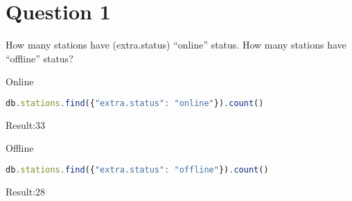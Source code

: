 \section{Question 1}

\begin{question}
  How many stations have (extra.status) “online” status. How many stations
  have “offline” status?
\end{question}

\begin{answer}
  Online
  \begin{lstlisting}[language=js]
db.stations.find({"extra.status": "online"}).count()
  \end{lstlisting}

  Result:33
\end{answer}

\begin{answer}
  Offline
  \begin{lstlisting}[language=js]
db.stations.find({"extra.status": "offline"}).count()
  \end{lstlisting}

  Result:28
\end{answer}
